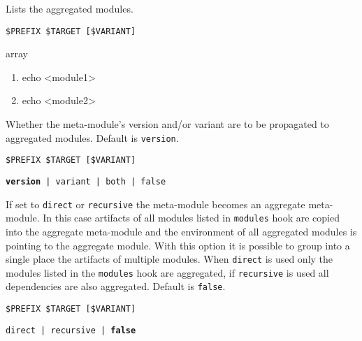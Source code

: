 \documentclass[a4paper,12pt,twoside]{article}
\newcommand{\code}[1]{\texttt{#1}}
\begin{document}
\begin{description}[style=nextline]
	\item[<module>{[}-common|<variant>{]}-modules] Lists the aggregated modules.
		\begin{description}[font=\textit,style=standard]
			\item[parameter] \tabto{2cm} \code{\$PREFIX \$TARGET [\$VARIANT]}
			\item[return] \tabto{2cm} array
				\begin{enumerate}
					\item echo <module1>
					\item echo <module2>
		\end{enumerate}
	\end{description}

	\item[<module>{[}-<variant>{]}-propagate-version] \label{propagate-version}Whether the meta-module's version and/or variant are to be propagated to aggregated modules. Default is \code{version}.
		\begin{description}[font=\textit,style=standard]
			\item[parameter] \tabto{2cm} \code{\$PREFIX \$TARGET [\$VARIANT]}
			\item[return] \tabto{2cm} \code{\textbf{version} | variant | both | false}
		\end{description}

	\item[<module>{[}-<variant>{]}-aggregate] \label{aggregate}If set to \code{direct} or \code{recursive} the meta-module becomes an aggregate meta-module. In this case artifacts of all modules listed in \code{modules} hook are copied into the aggregate meta-module and the environment of all aggregated modules is pointing to the aggregate module. With this option it is possible to group into a single place the artifacts of multiple modules. When \code{direct} is used only the modules listed in the \code{modules} hook are aggregated, if \code{recursive} is used all dependencies are also aggregated. Default is \code{false}.
	\begin{description}[font=\textit,style=standard]
	\item[parameter] \tabto{2cm} \code{\$PREFIX \$TARGET [\$VARIANT]}
	\item[return] \tabto{2cm} \code{direct | recursive | \textbf{false}}
	\end{description}
\end{description}
\end{document}
